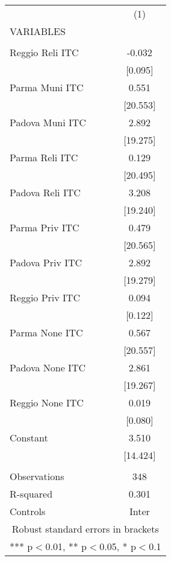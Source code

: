 \begin{tabular}{lc} \hline
 & (1) \\
VARIABLES &  \\ \hline
 &  \\
Reggio Reli ITC & -0.032 \\
 & [0.095] \\
Parma Muni ITC & 0.551 \\
 & [20.553] \\
Padova Muni ITC & 2.892 \\
 & [19.275] \\
Parma Reli ITC & 0.129 \\
 & [20.495] \\
Padova Reli ITC & 3.208 \\
 & [19.240] \\
Parma Priv ITC & 0.479 \\
 & [20.565] \\
Padova Priv ITC & 2.892 \\
 & [19.279] \\
Reggio Priv ITC & 0.094 \\
 & [0.122] \\
Parma None ITC & 0.567 \\
 & [20.557] \\
Padova None ITC & 2.861 \\
 & [19.267] \\
Reggio None ITC & 0.019 \\
 & [0.080] \\
Constant & 3.510 \\
 & [14.424] \\
 &  \\
Observations & 348 \\
R-squared & 0.301 \\
 Controls & Inter \\ \hline
\multicolumn{2}{c}{ Robust standard errors in brackets} \\
\multicolumn{2}{c}{ *** p$<$0.01, ** p$<$0.05, * p$<$0.1} \\
\end{tabular}
